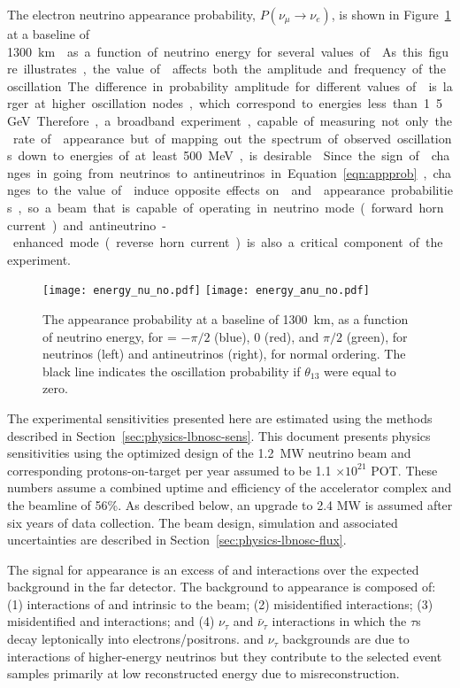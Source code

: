 The electron neutrino appearance probability, $P(\nu_\mu \rightarrow \nu_e)$, 
is shown in 
Figure~\ref{fig:oscprob} at a baseline of \SI{1300}\km{} as a function of neutrino 
energy for several values of \deltacp. As this figure illustrates, the value 
of \deltacp affects both the amplitude and frequency of
the oscillation. The difference in probability amplitude
for different values of \deltacp is larger at higher oscillation nodes, which 
correspond to energies less than 1.5~GeV. Therefore, a broadband experiment, 
capable of measuring not only the rate of \nue appearance but of mapping out the 
spectrum of observed oscillations down to energies of at least 500~MeV, 
is desirable~\cite{Diwan:2003bp}. Since the sign of  \deltacp changes in going from neutrinos to antineutrinos in Equation~\ref{eqn:appprob},
changes to the value of \deltacp induce opposite effects on \nue and
\anue appearance probabilities, so a beam that is capable of operating in
neutrino mode (forward horn current) and antineutrino-enhanced mode (reverse horn current)
is also a critical component of the experiment.



\begin{figure}
  \centering
\texttt{[image: energy\_nu\_no.pdf]}
\texttt{[image: energy\_anu\_no.pdf]}
  \caption{The appearance probability at a baseline of 1300~km,
  as a function of neutrino energy, for \deltacp = $-\pi/2$ (blue), 
  0 (red), and $\pi/2$ (green), for neutrinos (left) and antineutrinos
  (right), for normal ordering. The black line indicates the oscillation
  probability if $\theta_{13}$ were equal to zero.}
  \label{fig:oscprob}
\end{figure}

The experimental sensitivities presented here are estimated using the methods described in Section~\ref{sec:physics-lbnosc-sens}. This document presents physics sensitivities using the optimized design of the 1.2~MW neutrino beam and corresponding protons-on-target per year assumed to be 1.1 $\times 10^{21}$ POT.  These numbers assume a combined uptime and efficiency of the  accelerator complex and the  beamline of 56\%.  As described below, an upgrade to 2.4 MW is assumed after six years of data collection. The beam design, simulation and associated uncertainties are described in Section~\ref{sec:physics-lbnosc-flux}. 

The signal for \nue appearance is an excess of  %
\nue and \anue interactions over the expected background in the far detector.  The background to \nue appearance is composed of: (1)  interactions of \nue and \anue intrinsic to the beam; (2) misidentified  %
interactions;  (3) misidentified \numu and \anumu {} interactions; and (4) $\nu_\tau$ and $\bar{\nu}_\tau$  interactions in which the $\tau$s decay leptonically into electrons/positrons.  and $\nu_\tau$ backgrounds are due to interactions of higher-energy
neutrinos but they contribute to the selected event samples primarily at low reconstructed energy due to misreconstruction.

